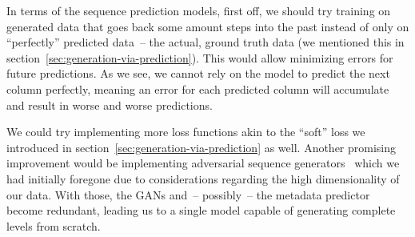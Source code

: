 In terms of the sequence prediction models, first off, we should try
training on generated data that goes back some amount steps into the
past instead of only on ``perfectly'' predicted data~-- the actual,
ground truth data (we mentioned this in
section~\ref{sec:generation-via-prediction}). This would allow
minimizing errors for future predictions. As we see, we cannot rely on
the model to predict the next column perfectly, meaning an error for
each predicted column will accumulate and result in worse and worse
predictions.

We could try implementing more loss functions akin to the ``soft''
loss we introduced in section~\ref{sec:generation-via-prediction} as
well. Another promising improvement would be implementing adversarial
sequence
generators~\cite{yuSeqGANSequenceGenerative2017,liAdversarialDiscreteSequence}
which we had initially foregone due to considerations regarding the
high dimensionality of our data. With those, the GANs and~-- possibly~--
the metadata predictor become redundant, leading us to a single model
capable of generating complete levels from scratch.



